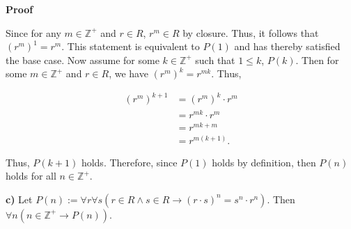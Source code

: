 \documentclass[12pt, a4paper]{article}
\begin{document}
\begin{addmargin}[2.8em]{2.8em}

    \noindent\textbf{Proof}
    
    \vspace{2mm}
    
    \noindent Since for any $m\in\mathbb{Z}^+$ and $r\in R$, $r^m\in R$ by closure. Thus, it follows that $(r^m)^1=r^m$. This statement is equivalent to $P(1)$ and has thereby satisfied the base case. Now assume for some $k\in\mathbb{Z}^+$ such that $1\leq k$, $P(k)$. Then for some $m\in\mathbb{Z}^+$ and $r\in R$, we have $(r^m)^k=r^{mk}$. Thus, 
    
    \begin{equation*}
        \begin{split}
            (r^m)^{k+1}& =(r^m)^k\cdot r^m \\
            & =r^{mk}\cdot r^m \\
            & =r^{mk+m} \\
            & =r^{m(k+1)}. 
        \end{split}
    \end{equation*}
    
    \noindent Thus, $P(k+1)$ holds. Therefore, since $P(1)$ holds by definition, then $P(n)$ holds for all $n\in\mathbb{Z}^+$.\hspace{94mm}\blacksquare
    
    \vspace{6mm}
    
\end{addmargin}

\par\textbf{c)} Let $P(n):=\forall r\forall s(r\in R\wedge s\in R\rightarrow (r\cdot s)^n=s^n\cdot r^n)$. Then $\forall n(n\in\mathbb{Z}^+\rightarrow P(n))$.

\vspace{4mm}
\end{document}
